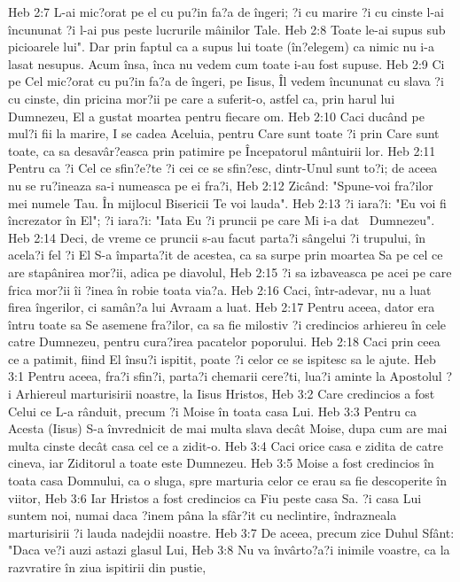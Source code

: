 Heb 2:7  L-ai mic?orat pe el cu pu?in fa?a de îngeri; ?i cu marire ?i cu cinste l-ai încununat ?i l-ai pus peste lucrurile mâinilor Tale.
Heb 2:8  Toate le-ai supus sub picioarele lui". Dar prin faptul ca a supus lui toate (în?elegem) ca nimic nu i-a lasat nesupus. Acum însa, înca nu vedem cum toate i-au fost supuse.
Heb 2:9  Ci pe Cel mic?orat cu pu?in fa?a de îngeri, pe Iisus, Îl vedem încununat cu slava ?i cu cinste, din pricina mor?ii pe care a suferit-o, astfel ca, prin harul lui Dumnezeu, El a gustat moartea pentru fiecare om.
Heb 2:10  Caci ducând pe mul?i fii la marire, I se cadea Aceluia, pentru Care sunt toate ?i prin Care sunt toate, ca sa desavâr?easca prin patimire pe Începatorul mântuirii lor.
Heb 2:11  Pentru ca ?i Cel ce sfin?e?te ?i cei ce se sfin?esc, dintr-Unul sunt to?i; de aceea nu se ru?ineaza sa-i numeasca pe ei fra?i,
Heb 2:12  Zicând: "Spune-voi fra?ilor mei numele Tau. În mijlocul Bisericii Te voi lauda".
Heb 2:13  ?i iara?i: "Eu voi fi încrezator în El"; ?i iara?i: "Iata Eu ?i pruncii pe care Mi i-a dat  Dumnezeu".
Heb 2:14  Deci, de vreme ce pruncii s-au facut parta?i sângelui ?i trupului, în acela?i fel ?i El S-a împarta?it de acestea, ca sa surpe prin moartea Sa pe cel ce are stapânirea mor?ii, adica pe diavolul,
Heb 2:15  ?i sa izbaveasca pe acei pe care frica mor?ii îi ?inea în robie toata via?a.
Heb 2:16  Caci, într-adevar, nu a luat firea îngerilor, ci samân?a lui Avraam a luat.
Heb 2:17  Pentru aceea, dator era întru toate sa Se asemene fra?ilor, ca sa fie milostiv ?i credincios arhiereu în cele catre Dumnezeu, pentru cura?irea pacatelor poporului.
Heb 2:18  Caci prin ceea ce a patimit, fiind El însu?i ispitit, poate ?i celor ce se ispitesc sa le ajute.
Heb 3:1  Pentru aceea, fra?i sfin?i, parta?i chemarii cere?ti, lua?i aminte la Apostolul ?i Arhiereul marturisirii noastre, la Iisus Hristos,
Heb 3:2  Care credincios a fost Celui ce L-a rânduit, precum ?i Moise în toata casa Lui.
Heb 3:3  Pentru ca Acesta (Iisus) S-a învrednicit de mai multa slava decât Moise, dupa cum are mai multa cinste decât casa cel ce a zidit-o.
Heb 3:4  Caci orice casa e zidita de catre cineva, iar Ziditorul a toate este Dumnezeu.
Heb 3:5  Moise a fost credincios în toata casa Domnului, ca o sluga, spre marturia celor ce erau sa fie descoperite în viitor,
Heb 3:6  Iar Hristos a fost credincios ca Fiu peste casa Sa. ?i casa Lui suntem noi, numai daca ?inem pâna la sfâr?it cu neclintire, îndrazneala marturisirii ?i lauda nadejdii noastre.
Heb 3:7  De aceea, precum zice Duhul Sfânt: "Daca ve?i auzi astazi glasul Lui,
Heb 3:8  Nu va învârto?a?i inimile voastre, ca la razvratire în ziua ispitirii din pustie,
